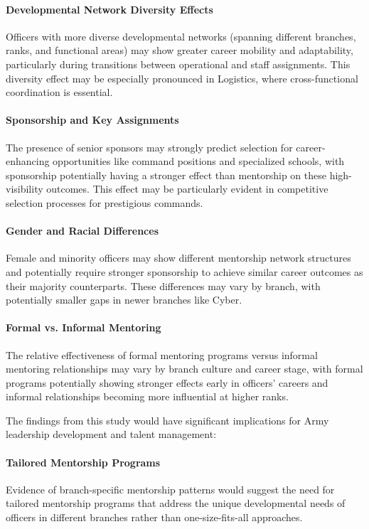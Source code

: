 \documentclass[main.tex]{subfiles}
\begin{document}
\paragraph{Developmental Network Diversity Effects} Officers with more diverse developmental networks (spanning different branches, ranks, and functional areas) may show greater career mobility and adaptability, particularly during transitions between operational and staff assignments. This diversity effect may be especially pronounced in Logistics, where cross-functional coordination is essential.

\paragraph{Sponsorship and Key Assignments} The presence of senior sponsors may strongly predict selection for career-enhancing opportunities like command positions and specialized schools, with sponsorship potentially having a stronger effect than mentorship on these high-visibility outcomes. This effect may be particularly evident in competitive selection processes for prestigious commands.

\paragraph{Gender and Racial Differences} Female and minority officers may show different mentorship network structures and potentially require stronger sponsorship to achieve similar career outcomes as their majority counterparts. These differences may vary by branch, with potentially smaller gaps in newer branches like Cyber.

\paragraph{Formal vs. Informal Mentoring} The relative effectiveness of formal mentoring programs versus informal mentoring relationships may vary by branch culture and career stage, with formal programs potentially showing stronger effects early in officers' careers and informal relationships becoming more influential at higher ranks.


The findings from this study would have significant implications for Army leadership development and talent management:

\paragraph{Tailored Mentorship Programs} Evidence of branch-specific mentorship patterns would suggest the need for tailored mentorship programs that address the unique developmental needs of officers in different branches rather than one-size-fits-all approaches.
\end{document}
